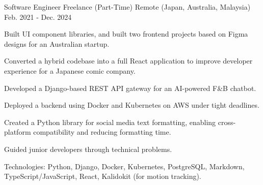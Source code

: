 

\begin{cventries}


  \cventry
    {Software Engineer} %
    {Freelance (Part-Time)} %
    {Remote (Japan, Australia, Malaysia)} %
    {Feb. 2021 - Dec. 2024} %
    {
      \begin{cvitems} %
        \item {Built UI component libraries, and built two frontend projects based on Figma designs for an Australian startup.}
        \item {Converted a hybrid codebase into a full React application to improve developer experience for a Japanese comic company.}
        \item {Developed a Django-based REST API gateway for an AI-powered F\&B chatbot.}
        \item {Deployed a backend using Docker and Kubernetes on AWS under tight deadlines.}
        \item {Created a Python library for social media text formatting, enabling cross-platform compatibility and reducing formatting time.}
        \item {Guided junior developers through technical problems.}
        \item {Technologies: Python, Django, Docker, Kubernetes, PostgreSQL, Markdown, TypeScript/JavaScript, React, Kalidokit (for motion tracking).}
      \end{cvitems}
    }


\end{cventries}
